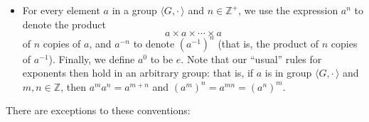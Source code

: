 \documentclass[10pt,]{book}
\theoremstyle{plain}
\theoremstyle{definition}
\theoremstyle{definition}
\theoremstyle{definition}
\theoremstyle{definition}
\numberwithin{equation}{section}
\def\Z{\mathbb{Z}}
\def\Gdot{\langle G, \cdot\,\rangle}
\begin{document}
\leavevmode%
\begin{itemize}[label=\textbullet]
\item{}For every element \(a\) in a group \(\Gdot\) and \(n\in \Z^+\), we use the expression \(a^n\) to denote  the product%
\begin{equation*}
a \times a \times \cdots \times a
\end{equation*}
of \(n\) copies of \(a\), and \(a^{-n}\) to denote \((a^{-1})^n\) (that is, the product of \(n\) copies of \(a^{-1}\)). Finally, we define \(a^0\) to be \(e\).  Note that our ``usual'' rules for exponents then hold in an arbitrary group: that is, if \(a\) is in group \(\langle G, \cdot\,\rangle\) and \(m,n\in \Z\), then \(a^m a^n = a^{m+n}\) and \((a^m)^n=a^{mn}=(a^n)^m\).%
\end{itemize}
There are exceptions to these conventions: \leavevmode%
\end{document}
